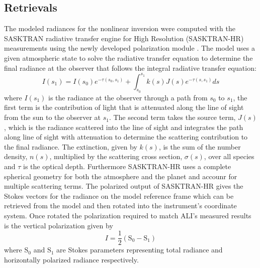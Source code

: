 \documentclass[12pt]{article}
\begin{document}
\subsection{Retrievals}
\label{sec:retrievals}

The modeled radiances for the nonlinear inversion were computed with the SASKTRAN radiative transfer engine \citep{Bourassa2008a} for High Resolution (SASKTRAN-HR) \citep{Zawada2015} measurements using the newly developed polarization module \citep{Dueck2015}. The model uses a given atmospheric state to solve the radiative transfer equation to determine the final radiance at the observer that follows the integral radiative transfer equation:
\begin{equation}
    I(s_{1}) = I(s_{0})e^{-\tau(s_{0}, s_{1})}+\int^{s_{1}}_{s_{0}}k(s)J(s)e^{-\tau(s, s_{1})}ds
\end{equation}
where $I(s_{1})$ is the radiance at the observer through a path from $s_{0}$ to $s_{1}$, the first term is the contribution of light that is attenuated along the line of sight from the sun to the observer at $s_{1}$. The second term takes the source term, $J(s)$, which is the radiance scattered into the line of sight and integrates the path along line of sight with attenuation to determine the scattering contribution to the final radiance. The extinction, given by $k(s)$, is the sum of the number density, $n(s)$, multiplied by the scattering cross section, $\sigma(s)$, over all species and $\tau$ is the optical depth. Furthermore SASKTRAN-HR uses a complete spherical geometry for both the atmosphere and the planet and accounr for multiple scattering terms. The polarized output of SASKTRAN-HR gives the Stokes vectors for the radiance on the model reference frame which can be retrieved from the model and then rotated into the instrument's coordinate system. Once rotated the polarization required to match ALI's measured results is the vertical polarization given by
\begin{equation}
    I = \frac{1}{2}\left(\mathrm{S_{0}}-\mathrm{S_{1}}\right)
\end{equation}
where $\mathrm{S_{0}}$ and $\mathrm{S_{1}}$ are Stokes parameters representing total radiance and horizontally polarized radiance respectively.
\end{document}
